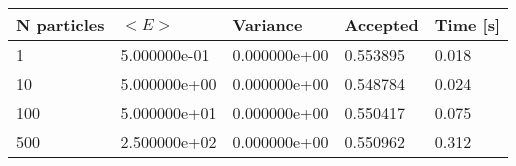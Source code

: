 \begin{table}[h!]
\centering 
\begin{tabular}{|l|l|l|l|l|}
\hline 
N particles & $<E>$ & Variance & Accepted & Time [s]\\ 
 \hline 
1 & 5.000000e-01 & 0.000000e+00 & 0.553895 & 0.018 \\ \hline 
10 & 5.000000e+00 & 0.000000e+00 & 0.548784 & 0.024 \\ \hline 
100 & 5.000000e+01 & 0.000000e+00 & 0.550417 & 0.075 \\ \hline 
500 & 2.500000e+02 & 0.000000e+00 & 0.550962 & 0.312 \\ \hline 
\end{tabular}
\label{tab:ha1} 
\end{table} 
